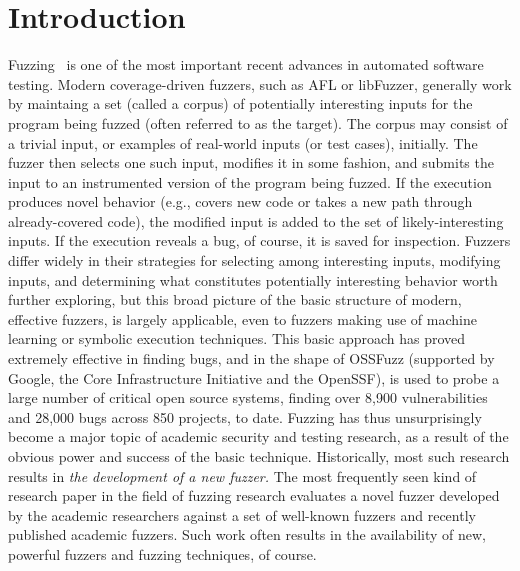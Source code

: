 





\section{Introduction}
\label{sec:intro}

Fuzzing~\cite{fuzzoverview} is one of the most important recent advances in 
automated software testing.  Modern coverage-driven fuzzers, such as AFL or 
libFuzzer, generally work by maintaing a set (called a corpus) of potentially interesting 
inputs for the program being fuzzed (often referred to as the target).  The corpus may consist of a 
trivial input, or examples of real-world inputs (or test cases), initially.  
The fuzzer then selects one such input, modifies it in some fashion, and 
submits the input to an instrumented version of the program being fuzzed.  If 
the execution produces novel behavior (e.g., covers new code or takes a new 
path through already-covered code), the modified input is added to the set of 
likely-interesting inputs.   If the execution reveals a bug, of course, it is 
saved for inspection.   Fuzzers differ widely in their strategies for selecting 
among interesting inputs, modifying inputs, and determining what constitutes 
potentially interesting behavior worth further exploring, but this broad picture of the basic 
structure of modern, effective fuzzers, is largely applicable, even to fuzzers 
making use of machine learning or symbolic execution techniques.
This basic approach has proved extremely effective in finding bugs, and in the 
shape of OSSFuzz (supported by Google, the Core Infrastructure Initiative and 
the OpenSSF), is used to probe a large number of critical open source systems, 
finding over 8,900 vulnerabilities and 28,000 bugs across 850 projects, to date.
Fuzzing has thus unsurprisingly become a major topic of academic security and 
testing research, as a result of the obvious power and success of the basic 
technique.  Historically, most such research results in \emph{the development of a 
new fuzzer.}  The most frequently seen kind of research paper in the field of fuzzing
research evaluates a
novel fuzzer developed by the academic researchers against a set of well-known 
fuzzers and recently published academic fuzzers.  Such work often results in 
the availability of new, powerful fuzzers and fuzzing techniques, of course.  

